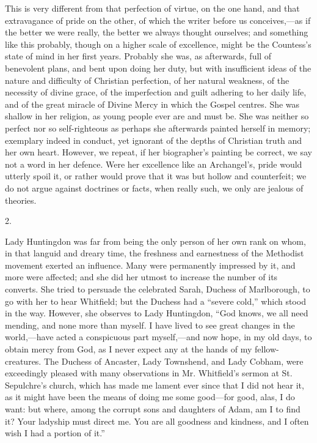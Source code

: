 This is very different from that perfection of
virtue, on the one hand, and that extravagance of pride on the other,
of which the writer before us conceives,—as if the better we were
really, the better we always thought ourselves; and something like
this probably, though on a higher scale of excellence, might be the
Countess's state of mind in her first years. Probably she was, as
afterwards, full of benevolent plans, and bent upon doing her duty,
but with insufficient ideas of the nature and difficulty of Christian
perfection, of her natural weakness, of the necessity of divine grace,
of the imperfection and guilt adhering to her daily life, and of the
great miracle of Divine Mercy in which the Gospel centres. She was
shallow in her religion, as young people ever are and must be. She was
neither so perfect nor so self-righteous as perhaps she afterwards
painted herself in memory; exemplary indeed in conduct, yet ignorant
of the depths of Christian truth and her own heart. However, we
repeat, if her biographer's painting be correct, we say not a word in
her defence. Were her excellence like an Archangel's, pride would
utterly spoil it, or rather would prove that it was but hollow and
counterfeit; we do not argue against doctrines or facts, when really
such, we only are jealous of theories.

2.

Lady Huntingdon was far from being the only
person of her own rank on whom, in that languid and dreary time, the
freshness and earnestness of the Methodist movement exerted an
influence. Many were permanently impressed by it, and more were
affected; and she did her utmost to increase the number of its
converts. She tried to persuade the celebrated Sarah, Duchess of
Marlborough, to go with her to hear Whitfield; but the Duchess had a ``severe
cold,'' which stood in the way. However, she observes to Lady
Huntingdon, ``God knows, we all need mending, and none more than
myself. I have lived to see great changes in the world,—have acted a
conspicuous part myself,—and now hope, in my old days, to obtain
mercy from God, as I never expect any at the hands of my
fellow-creatures. The Duchess of Ancaster, Lady Townshend, and Lady
Cobham, were exceedingly pleased with many observations in Mr.
Whitfield's sermon at St. Sepulchre's church, which has made me lament
ever since that I did not hear it, as it might have been the means of
doing me some good—for good, alas, I do want: but where, among the
corrupt sons and daughters of Adam, am I to find it? Your ladyship
must direct me. You are all goodness and kindness, and I often wish I
had a portion of it.''

